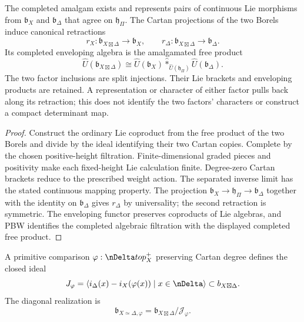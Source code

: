 \begin{theorem}
The completed amalgam exists and represents pairs of continuous Lie morphisms from $\mathfrak b_X$ and $\mathfrak b_\Delta$ that agree on $\mathfrak h_\Pi$.  The Cartan projections of the two Borels induce canonical retractions
\[
 r_X:\mathfrak b_{X\boxtimes\Delta}\longrightarrow\mathfrak b_X,
 \qquad
 r_\Delta:\mathfrak b_{X\boxtimes\Delta}\longrightarrow\mathfrak b_\Delta.
\]
Its completed enveloping algebra is the amalgamated free product
\[
 \widehat U(\mathfrak b_{X\boxtimes\Delta})
 \cong
 \widehat U(\mathfrak b_X)
 \widehat *_{\widehat U(\mathfrak h_\Pi)}
 \widehat U(\mathfrak b_\Delta).
\]
The two factor inclusions are split injections. Their Lie brackets and
enveloping products are retained. A representation or character of
either factor pulls back along its retraction; this does not identify
the two factors' characters or construct a compact determinant map.
\end{theorem}
\begin{proof}
Construct the ordinary Lie coproduct from the free product of the two Borels and divide by the ideal identifying their two Cartan copies.  Complete by the chosen positive-height filtration. Finite-dimensional
graded pieces and positivity make each fixed-height Lie calculation
finite. Degree-zero Cartan brackets reduce to the prescribed weight
action. The separated inverse limit has the stated continuous mapping
property.  The projection $\mathfrak b_X\to\mathfrak h_\Pi\to\mathfrak b_\Delta$ together with the identity on $\mathfrak b_\Delta$ gives $r_\Delta$ by universality; the second retraction is symmetric.  The enveloping functor preserves coproducts of Lie algebras, and PBW identifies the completed algebraic filtration with the displayed completed free product.
\end{proof}

\begin{definition}
A primitive comparison $\varphi:\nDelta\to\mathfrak p_X^+$ preserving Cartan degree defines the closed ideal
\[
 \mathcal J_\varphi
 =\overline{\angles{
   i_\Delta(x)-i_X(\varphi(x))\mid x\in\nDelta
 }}
 \subset\mathfrak b_{X\boxtimes\Delta}.
\]
The diagonal realization is
\[
 \mathfrak b_{X\simeq\Delta,\varphi}
 =\mathfrak b_{X\boxtimes\Delta}/\mathcal J_\varphi.
\]
\end{definition}

